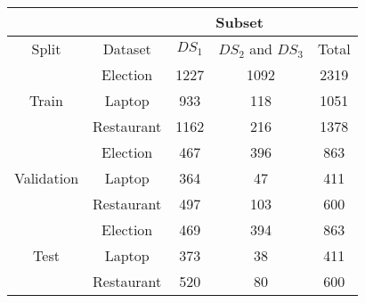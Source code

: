 \begin{tabular}{|c|c|c|c|c|}
\hline
& & \multicolumn{2}{c|}{Subset} & \\
\hline
Split & Dataset &  $DS_1$ &  $DS_2$ and $DS_3$ &  Total \\ 
\hline
\multirow{3}{*}{Train} & Election   &    1227 &  1092 & 2319 \\
& Laptop     &    933 &  118 &  1051 \\
& Restaurant &    1162 &  216 & 1378 \\
\hline
\multirow{3}{*}{Validation} & Election   &    467 &  396 & 863 \\
& Laptop     &    364 &  47 &  411 \\
& Restaurant &    497 &  103 & 600 \\
\hline
\multirow{3}{*}{Test} & Election   &    469 &  394 & 863 \\
& Laptop     &    373 &  38 &  411 \\
& Restaurant &    520 &  80 & 600 \\
\hline
\end{tabular}
